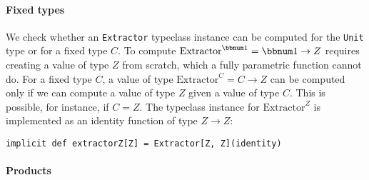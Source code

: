 \paragraph{Fixed types}

We check whether an \lstinline!Extractor! typeclass instance can
be computed for the \lstinline!Unit! type or for a fixed type $C$.
To compute $\text{Extractor}^{\bbnum 1}=\bbnum 1\rightarrow Z$ requires
creating a value of type $Z$ from scratch, which a fully parametric
function cannot do. For a fixed type $C$, a value of type $\text{Extractor}^{C}=C\rightarrow Z$
can be computed only if we can compute a value of type $Z$ given
a value of type $C$. This is possible, for instance, if $C=Z$. The
typeclass instance for $\text{Extractor}^{Z}$ is implemented as an
identity function of type $Z\rightarrow Z$:
\begin{lstlisting}
implicit def extractorZ[Z] = Extractor[Z, Z](identity)
\end{lstlisting}


\paragraph{Products}


